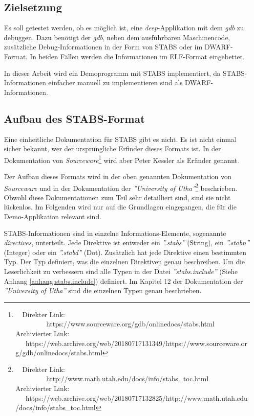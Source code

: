 \subsection{Zielsetzung}
Es soll getestet werden, ob es möglich ist, eine \textit{deep}-Applikation mit dem \textit{gdb} zu debuggen.
Dazu benötigt der \textit{gdb}, neben dem ausführbaren Maschinencode, zusätzliche Debug-Informationen in der Form von STABS oder im DWARF-Format.
In beiden Fällen werden die Informationen im ELF-Format eingebettet.

In dieser Arbeit wird ein Demoprogramm mit STABS implementiert, da STABS-Informationen einfacher manuell zu implementieren sind als DWARF-Informationen.


\subsection{Aufbau des STABS-Format}
Eine einheitliche Dokumentation für STABS gibt es nicht.
Es ist nicht einmal sicher bekannt, wer der ursprüngliche Erfinder dieses Formats ist.
In der Dokumentation von \textit{Sourceware}\footnote{\ \ Direkter Link: \ \ \ \ \ \ \ \ \ https://www.sourceware.org/gdb/onlinedocs/stabs.html\\ Archivierter Link: \ \ \ https://web.archive.org/web/20180717131349/https://www.sourceware.org/gdb/onlinedocs/stabs.html} wird aber Peter Kessler als Erfinder genannt.

Der Aufbau dieses Formats wird in der oben genannten Dokumentation von \textit{Sourceware} und in der Dokumentation der \textit{''University of Utha''}\footnote{\ \ Direkter Link: \ \ \ \ \ \ \ \ \ http://www.math.utah.edu/docs/info/stabs\_toc.html\\ Archivierter Link: \ \ \ https://web.archive.org/web/20180717132825/http://www.math.utah.edu/docs/info/stabs\_toc.html} beschrieben.
Obwohl diese Dokumentationen zum Teil sehr detailliert sind, sind sie nicht lückenlos.
Im Folgenden wird nur auf die Grundlagen eingegangen, die für die Demo-Applikation relevant sind.

STABS-Informationen sind in einzelne Informations-Elemente, sogenannte \textit{directives}, unterteilt.
Jede Direktive ist entweder ein \textit{''.stabs''} (String), ein \textit{''.stabn''} (Integer) oder ein \textit{''.stabd''} (Dot).
Zusätzlich hat jede Direktive einen bestimmten Typ.
Der Typ definiert, was die einzelnen Direktiven genau beschreiben.
Um die Leserlichkeit zu verbessern sind alle Typen in der Datei \textit{''stabs.include''} (Siehe Anhang \ref{anhang:stabs.include}) definiert.
Im Kapitel 12 der Dokumentation der \textit{''University of Utha''} sind die einzelnen Typen genau beschrieben.

